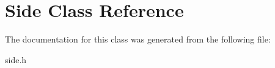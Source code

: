 \hypertarget{class_side}{}\section{Side Class Reference}
\label{class_side}


The documentation for this class was generated from the following file\+:\begin{DoxyCompactItemize}
\item 
side.\+h\end{DoxyCompactItemize}
